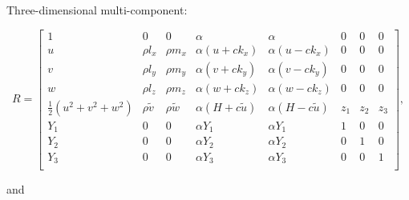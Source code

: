 Three-\/dimensional multi-\/component\+:

\[ \begin{equation*} R= \begin{bmatrix} 1 & 0 & 0 & \alpha & \alpha & 0 & 0 & 0\\ u & \rho l_x& \rho m_x & \alpha (u+c k_x) & \alpha (u-c k_x) & 0 & 0 & 0\\ v & \rho l_y & \rho m_y & \alpha (v+c k_y) & \alpha (v-c k_y) & 0 & 0 & 0\\ w & \rho l_z & \rho m_z & \alpha (w+c k_z) & \alpha (w-c k_z)& 0 & 0 & 0 \\ \frac{1}{2}(u^2+v^2+w^2) & \rho \tilde{v} & \rho \tilde{w} &\alpha (H+c \tilde{u}) & \alpha (H-c \tilde{u} )& z_1 & z_2 & z_3\\ Y_1 & 0 & 0 & \alpha Y_1 & \alpha Y_1 & 1 & 0 & 0\\ Y_2 & 0 & 0 & \alpha Y_2 & \alpha Y_2& 0 & 1 & 0\\ Y_3 & 0 & 0 & \alpha Y_3 & \alpha Y_3 & 0 & 0 & 1\\ \end{bmatrix}, \end{equation*} \]

and

